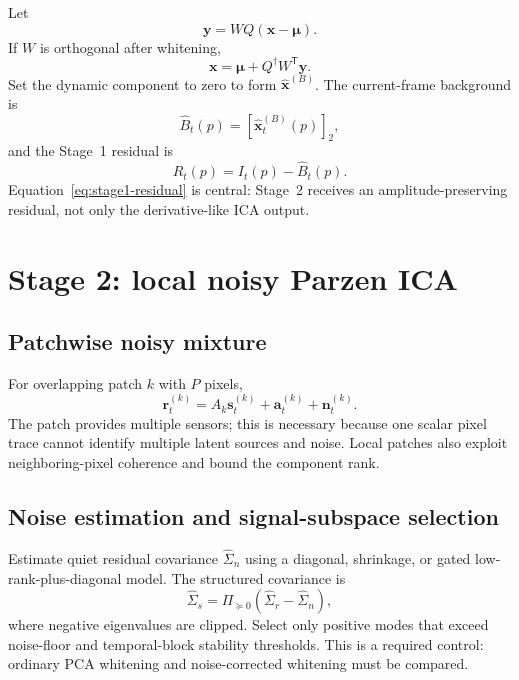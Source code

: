 \documentclass[11pt]{article}
\newcommand{\trans}{\mathsf T}
\begin{document}
Let
\begin{equation}
\bm y=WQ(\bm x-\bm\mu).
\end{equation}
If $W$ is orthogonal after whitening,
\begin{equation}
\bm x
=
\bm\mu+Q^{\dagger}W^{\trans}\bm y.
\end{equation}
Set the dynamic component to zero to form
$\widehat{\bm x}^{(B)}$. The current-frame background is
\begin{equation}
\widehat B_t(p)=
[\widehat{\bm x}^{(B)}_t(p)]_2,
\end{equation}
and the Stage~1 residual is
\begin{equation}
R_t(p)=I_t(p)-\widehat B_t(p).
\label{eq:stage1-residual}
\end{equation}
Equation~\eqref{eq:stage1-residual} is central: Stage~2 receives an
amplitude-preserving residual, not only the derivative-like ICA output.

\section{Stage 2: local noisy Parzen ICA}

\subsection{Patchwise noisy mixture}

For overlapping patch $k$ with $P$ pixels,
\begin{equation}
\bm r_t^{(k)}
=A_k\bm s_t^{(k)}+\bm a_t^{(k)}+\bm n_t^{(k)}.
\label{eq:noisy-patch}
\end{equation}
The patch provides multiple sensors; this is necessary because one scalar pixel
trace cannot identify multiple latent sources and noise. Local patches also
exploit neighboring-pixel coherence and bound the component rank.

\subsection{Noise estimation and signal-subspace selection}

Estimate quiet residual covariance $\widehat\Sigma_n$ using a diagonal,
shrinkage, or gated low-rank-plus-diagonal model. The structured covariance is
\begin{equation}
\widehat\Sigma_s
=
\Pi_{\succeq0}
(\widehat\Sigma_r-\widehat\Sigma_n),
\label{eq:noise-corrected-cov}
\end{equation}
where negative eigenvalues are clipped. Select only positive modes that exceed
noise-floor and temporal-block stability thresholds. This is a required control:
ordinary PCA whitening and noise-corrected whitening must be compared.
\end{document}
